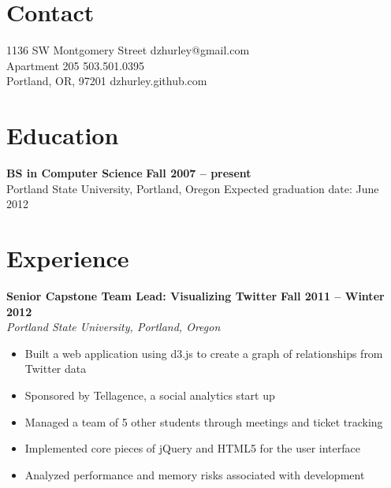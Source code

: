 \documentclass[margin,line]{resume}
\begin{document}
\begin{resume}

    \section{\mysidestyle Contact}

    1136 SW Montgomery Street  \hfill dzhurley@gmail.com  \vspace{0mm}\\\vspace{0mm}%
    Apartment 205              \hfill 503.501.0395        \vspace{0mm}\\\vspace{0mm}%
    Portland, OR, 97201        \hfill dzhurley.github.com \vspace{0mm}\\\vspace{0mm}%

    \section{\mysidestyle Education}

    \textbf{BS in Computer Science}             \hfill \textbf{ Fall 2007 -- present}      \vspace{2mm}\\\vspace{1mm}%
    Portland State University, Portland, Oregon \hfill Expected graduation date: June 2012 \vspace{-3mm}\\\vspace{-1mm}%

    \section{\mysidestyle Experience}

    \textbf{Senior Capstone Team Lead: Visualizing Twitter} \hfill \textbf{Fall 2011 -- Winter 2012} \vspace{2mm}\\\vspace{1mm}%
    \textsl{Portland State University, Portland, Oregon}
    \begin{itemize}
        \item Built a web application using d3.js to create a graph of relationships from Twitter data
        \item Sponsored by Tellagence, a social analytics start up
        \item Managed a team of 5 other students through meetings and ticket tracking
        \item Implemented core pieces of jQuery and HTML5 for the user interface
        \item Analyzed performance and memory risks associated with development
    \end{itemize}


\end{resume}
\end{document}
